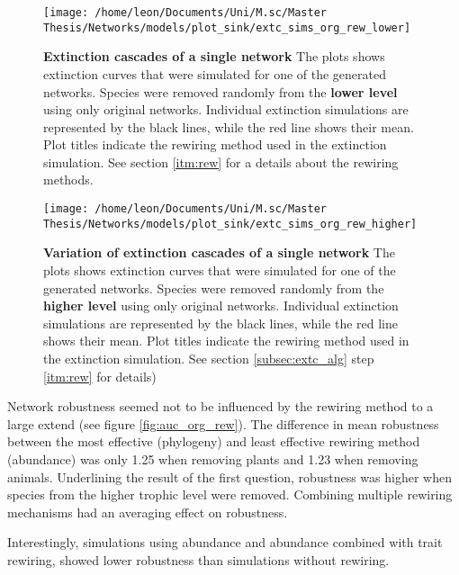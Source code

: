 \documentclass[12pt,a4paper]{article}
\begin{document}
\begin{figure}[H]
	 \texttt{[image: /home/leon/Documents/Uni/M.sc/Master Thesis/Networks/models/plot\_sink/extc\_sims\_org\_rew\_lower]}
	 \caption{\textbf{Extinction cascades of a single network} The plots shows extinction curves that were simulated for one of the generated networks. Species were removed randomly from the \textbf{lower level} using only original networks. Individual extinction simulations are represented by the black lines, while the red line shows their mean. Plot titles indicate the rewiring method used in the extinction simulation. See section \ref{itm:rew} for a details about the rewiring methods.}
	 \label{fig:extc_org_rew_lower}
\end{figure}


\begin{figure}[H]
	 \texttt{[image: /home/leon/Documents/Uni/M.sc/Master Thesis/Networks/models/plot\_sink/extc\_sims\_org\_rew\_higher]}
	 \caption{\textbf{Variation of extinction cascades of a single network} The plots shows extinction curves that were simulated for one of the generated networks. Species were removed randomly from the \textbf{higher level} using only original networks. Individual extinction simulations are represented by the black lines, while the red line shows their mean. Plot titles indicate the rewiring method used in the extinction simulation. See section \ref{subsec:extc_alg} step \ref{itm:rew} for details)}
	 \label{fig:extc_org_rew_higher}
\end{figure}

Network robustness seemed not to be influenced by the rewiring method to a large extend (see figure \ref{fig:auc_org_rew}). The difference in mean robustness between the most effective (phylogeny) and least effective rewiring method (abundance) was only 1.25 when removing plants and 1.23 when removing animals. Underlining the result of the first question, robustness was higher when species from the higher trophic level were removed. Combining multiple rewiring mechanisms had an averaging effect on robustness.\par 
Interestingly, simulations using abundance and abundance combined with trait rewiring, showed lower robustness than simulations without rewiring.
\end{document}
